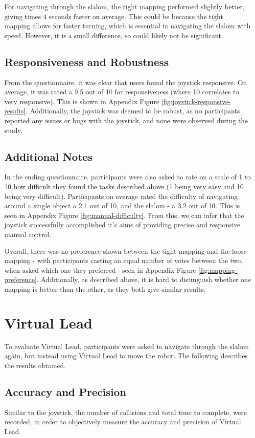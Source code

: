 \documentclass{l4proj}
\begin{document}
For navigating through the slalom, the tight mapping performed slightly better, giving times 4 seconds faster on average. This could be because the tight mapping allows for faster turning, which is essential in navigating the slalom with speed. However, it is a small difference, so could likely not be significant.

\subsection{Responsiveness and Robustness}
From the questionnaire, it was clear that users found the joystick responsive. On average, it was rated a 9.5 out of 10 for responsiveness (where 10 correlates to very responsive). This is shown in Appendix Figure \ref{fig:joystick-responsive-results}. Additionally, the joystick was deemed to be robust, as no participants reported any issues or bugs with the joystick, and none were observed during the study.


\subsection{Additional Notes}
In the ending questionnaire, participants were also asked to rate on a scale of 1 to 10 how difficult they found the tasks described above (1 being very easy and 10 being very difficult). Participants on average rated the difficulty of navigating around a single object a 2.1 out of 10, and the slalom - a 3.2 out of 10. This is seen in Appendix Figure \ref{fig:manual-difficulty}. From this, we can infer that the joystick successfully accomplished it's aims of providing precise and responsive manual control.

Overall, there was no preference shown between the tight mapping and the loose mapping - with participants casting an equal number of votes between the two, when asked which one they preferred - seen in Appendix Figure \ref{fig:mapping-preference}. Additionally, as described above, it is hard to distinguish whether one mapping is better than the other, as they both give similar results.


\section{Virtual Lead}
To evaluate Virtual Lead, participants were asked to navigate through the slalom again, but instead using Virtual Lead to move the robot. The following describes the results obtained.

\subsection{Accuracy and Precision}
Similar to the joystick, the number of collisions and total time to complete, were recorded, in order to objectively measure the accuracy and precision of Virtual Lead.
\end{document}
